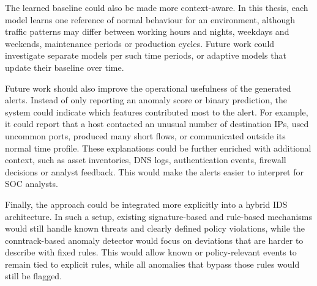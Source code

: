The learned baseline could also be made more context-aware. In this thesis, each model learns one reference of normal behaviour for an environment, although traffic patterns may differ between working hours and nights, weekdays and weekends, maintenance periods or production cycles. Future work could investigate separate models per such time periods, or adaptive models that update their baseline over time.

Future work should also improve the operational usefulness of the generated alerts. Instead of only reporting an anomaly score or binary prediction, the system could indicate which features contributed most to the alert. For example, it could report that a host contacted an unusual number of destination IPs, used uncommon ports, produced many short flows, or communicated outside its normal time profile. These explanations could be further enriched with additional context, such as asset inventories, DNS logs, authentication events, firewall decisions or analyst feedback. This would make the alerts easier to interpret for SOC analysts.


Finally, the approach could be integrated more explicitly into a hybrid IDS architecture. In such a setup, existing signature-based and rule-based mechanisms would still handle known threats and clearly defined policy violations, while the conntrack-based anomaly detector would focus on deviations that are harder to describe with fixed rules. This would allow known or policy-relevant events to remain tied to explicit rules, while all anomalies that bypass those rules would still be flagged.